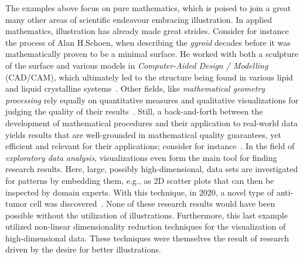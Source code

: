 \documentclass{notices}
\begin{document}
The examples above focus on pure mathematics, which is poised to join a great many other areas of scientific endeavour embracing illustration.  In applied mathematics, illustration has already made great strides.  Consider for instance the process of Alan H.\@ Schoen, when describing the \emph{gyroid} decades before it was mathematically proven to be a minimal surface.
He worked with both a sculpture of the surface and various models in \emph{Computer-Aided Design / Modelling} (CAD/CAM), which ultimately led to the structure being found in various lipid and liquid crystalline systems~\cite{schoen2012reflections}.
Other fields, like \emph{mathematical geometry processing} rely equally on quantitative measures and qualitative visualizations for judging the quality of their results~\cite{lavoue2010comparison}.
Still, a back-and-forth between the development of mathematical procedures and their application to real-world data yields results that are well-grounded in mathematical quality guarantees, yet efficient and relevant for their applications; consider for instance~\cites{alexa2022super,sawhney2022gridfree,sharp2022spelunking}.
In the field of \emph{exploratory data analysis}, visualizations even form the main tool for finding research results.
Here, large, possibly high-dimensional, data sets are investigated for patterns by embedding them, e.g., as 2D scatter plots that can then be inspected by domain experts.
With this technique, in 2020, a novel type of anti-tumor cell was discovered~\cite{vries2020highdimensional}.
None of these research results would have been possible without the utilization of illustrations.
Furthermore, this last example utilized non-linear dimensionality reduction techniques for the visualization of high-dimensional data. These techniques were themselves the result of research driven by the desire for better illustrations.
\end{document}
